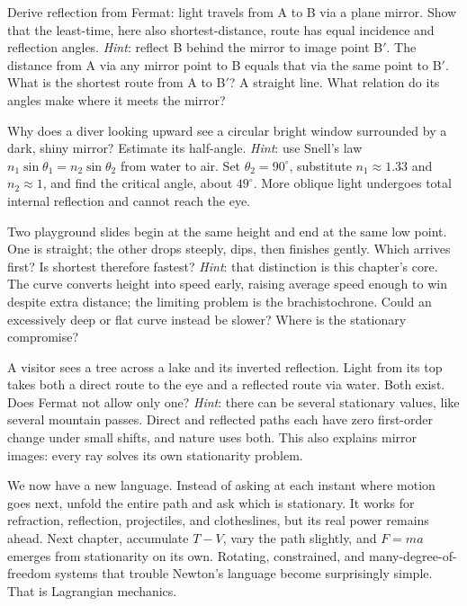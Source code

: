 \begin{puzzles}
\item Derive reflection from Fermat: light travels from A to B via a plane mirror. Show that the least-time, here also shortest-distance, route has equal incidence and reflection angles. \emph{Hint}: reflect B behind the mirror to image point B$'$. The distance from A via any mirror point to B equals that via the same point to B$'$. What is the shortest route from A to B$'$? A straight line. What relation do its angles make where it meets the mirror?
\item Why does a diver looking upward see a circular bright window surrounded by a dark, shiny mirror? Estimate its half-angle. \emph{Hint}: use Snell's law \(n_1\sin\theta_1=n_2\sin\theta_2\) from water to air. Set \(\theta_2=90^{\circ}\), substitute \(n_1\approx1.33\) and \(n_2\approx1\), and find the critical angle, about \(49^{\circ}\). More oblique light undergoes total internal reflection and cannot reach the eye.
\item Two playground slides begin at the same height and end at the same low point. One is straight; the other drops steeply, dips, then finishes gently. Which arrives first? Is shortest therefore fastest? \emph{Hint}: that distinction is this chapter's core. The curve converts height into speed early, raising average speed enough to win despite extra distance; the limiting problem is the brachistochrone. Could an excessively deep or flat curve instead be slower? Where is the stationary compromise?
\item A visitor sees a tree across a lake and its inverted reflection. Light from its top takes both a direct route to the eye and a reflected route via water. Both exist. Does Fermat not allow only one? \emph{Hint}: there can be several stationary values, like several mountain passes. Direct and reflected paths each have zero first-order change under small shifts, and nature uses both. This also explains mirror images: every ray solves its own stationarity problem.
\end{puzzles}

We now have a new language. Instead of asking at each instant where motion goes next, unfold the entire path and ask which is stationary. It works for refraction, reflection, projectiles, and clotheslines, but its real power remains ahead. Next chapter, accumulate \(T-V\), vary the path slightly, and \(F=ma\) emerges from stationarity on its own. Rotating, constrained, and many-degree-of-freedom systems that trouble Newton's language become surprisingly simple. That is Lagrangian mechanics.
